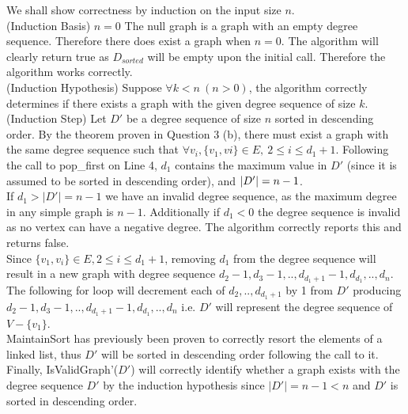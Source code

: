 \documentclass[12pt]{article}
\newenvironment{lemma}[2][Lemma]{\begin{trivlist}
\item[\hskip \labelsep {\bfseries #1}\hskip \labelsep {\bfseries #2.}]}{\end{trivlist}}
\newenvironment{question}[2][Question]{\begin{trivlist}
\item[\hskip \labelsep {\bfseries #1}\hskip \labelsep {\bfseries #2.}]}{\end{trivlist}}
\DeclarePairedDelimiter\abs{\lvert}{\rvert}%
\begin{document}
\begin{question}{3 (c)}
\begin{lemma}{3.1}
    We shall show correctness by induction on the input size $n$. \\

    (Induction Basis) $n = 0$ The null graph is a graph with an empty degree sequence.
    Therefore there does exist a graph when $n = 0$.  The algorithm will clearly
    return true as $D_{sorted}$ will be empty upon the initial call.  Therefore
    the algorithm works correctly. \\

    (Induction Hypothesis) Suppose $\forall k < n\ (n > 0)$, the algorithm correctly
    determines if there exists a graph with the given degree sequence of size $k$. \\

    (Induction Step) Let $D'$ be a degree sequence of size $n$ sorted in descending order.
    By the theorem proven in Question 3 (b), there must exist a graph with the same
    degree sequence such that
    $\forall v_{i}, \{v_{1}, v{i}\} \in E,\ 2 \leq i \leq d_{1} + 1$.
    Following the call to pop\_first on Line 4, $d_{1}$ contains the maximum value
    in $D'$ (since it is assumed to be sorted in descending order), and
    $\abs{D'} = n - 1$.\\

    If $d_{1} > |D'| = n - 1$ we have an invalid degree sequence,
    as the maximum degree in any simple graph is $n - 1$. Additionally if
    $d_{1} < 0$ the degree sequence is invalid as no vertex can have a negative
    degree.  The algorithm correctly reports this and returns false.\\

    Since $\{v_{1}, v_{i}\} \in E, 2 \leq i \leq d_{1}+1$,
    removing $d_{1}$ from the degree sequence will result in a new graph with
    degree sequence $d_{2} - 1, d_{3} - 1,..,d_{d_{1}+1} - 1,d_{d_{1}},..,d_{n}$. \\

    The following for loop will decrement each of
    $d_{2},..,d_{d_{1}+1}$ by 1 from $D'$ producing\\
    $d_{2}-1,d_{3}-1,..,d_{d_{1}+1}-1,d_{d_{1}},..,d_{n}$ i.e. $D'$ will represent
    the degree sequence of $V - \{v_{1}\}$. \\

    MaintainSort has previously been proven to correctly resort the elements
    of a linked list, thus $D'$ will be sorted in descending order following
    the call to it. \\

    Finally, IsValidGraph'($D'$) will correctly identify whether a graph
    exists with the degree sequence $D'$ by the induction hypothesis since
    $|D'| = n - 1 < n$ and $D'$ is sorted in descending order. \\


\end{lemma}
\end{question}
\end{document}
